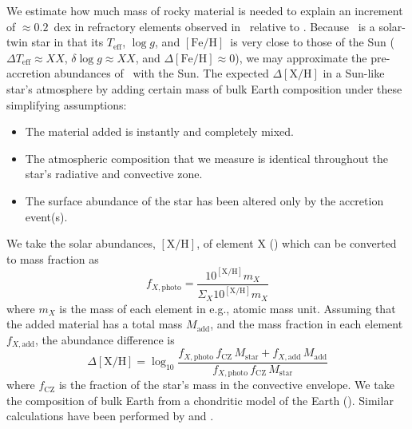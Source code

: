 \documentclass[12pt,letterpaper,margin=1in]{article}
\newcommand*\elem[1]{\ensuremath{\mathrm{#1}}}
\newcommand*\elemH[1]{\ensuremath{[\mathrm{#1}/\elem{H}]}}
\newcommand*\logg{\ensuremath{\log{g}}}
\newcommand*{\feh}{\ensuremath{\elemH{Fe}}}
\newcommand{\sunanalog}{\text{Krios}}
\newcommand{\bizarreone}{\text{Kronos}}
\begin{document}
We estimate how much mass of rocky material is needed to explain an increment of
$\approx 0.2$~dex in refractory elements observed in \bizarreone\
relative to \sunanalog.
Because \sunanalog\ is a solar-twin star in that its $T_\mathrm{eff}$, \logg,
and \feh\ is very close to those of the Sun ($\Delta T_\mathrm{eff} \approx XX$,
$\delta\logg \approx XX$, and $\Delta\feh \approx 0$),
we may approximate the pre-accretion abundances of \bizarreone\ with the Sun.
The expected $\Delta\elemH{X}$
in a Sun-like star's atmosphere by adding certain mass of bulk Earth composition
under these simplifying assumptions:
\begin{itemize}
  \item The material added is instantly and completely mixed.
  \item The atmospheric composition that we measure is identical throughout
    the star's radiative and convective zone.
  \item The surface abundance of the star has been altered only by the
    accretion event(s).
\end{itemize}
We take the solar abundances, $\elemH{X}$, of element \elem{X}
(\cite{Asplund:2009aa}) which can be converted to mass fraction as
\begin{equation}
  f_{X,\mathrm{photo}} = \frac{10^{\elemH{X}} m_X}{\Sigma_X 10^{\elemH{X}} m_X}
\end{equation}
where $m_X$ is the mass of each element in e.g., atomic mass unit.
Assuming that the added material has a total mass $M_\mathrm{add}$, and the
mass fraction in each element $f_{X,\mathrm{add}}$,
the abundance difference is
\begin{equation}
  \Delta\elemH{X} = \log_{10} \frac{f_{X,\mathrm{photo}}\,f_\mathrm{CZ}\,M_\mathrm{star}
    + f_{X,\mathrm{add}}\,M_\mathrm{add}}
    {f_{X,\mathrm{photo}}\,f_\mathrm{CZ}\,M_\mathrm{star}}
\end{equation}
where $f_\mathrm{CZ}$ is the fraction of the star's mass in the convective envelope.
We take the composition of bulk Earth from a chondritic model of the Earth
(\cite{mcdonough2001composition}).
Similar calculations have been performed by \citet{Chambers:2010aa} and
\citet{Mack:2014aa,Mack:2016aa}.

%
\end{document}
